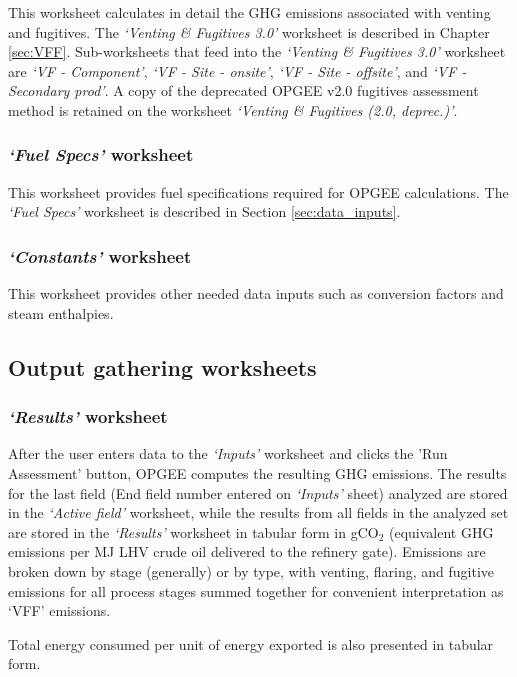 \documentclass[11pt]{report}
\newcommand{\sheet}[1]{\textit{`{#1}'}}
\begin{document}
This worksheet calculates in detail the GHG emissions associated with venting and fugitives. The \sheet{Venting \& Fugitives 3.0} worksheet is described in Chapter \ref{sec:VFF}. Sub-worksheets that feed into the  \sheet{Venting \& Fugitives 3.0}  worksheet are \sheet{VF - Component}, \sheet{VF - Site - onsite}, \sheet{VF - Site - offsite}, and \sheet{VF - Secondary prod}. A copy of the deprecated OPGEE v2.0 fugitives assessment method is retained on the worksheet \sheet{Venting \& Fugitives (2.0, deprec.)}.

\subsubsection{\sheet{Fuel Specs} worksheet}

This worksheet provides fuel specifications required for OPGEE calculations. The \sheet{Fuel Specs} worksheet is described in Section \ref{sec:data_inputs}.

\subsubsection{\sheet{Constants} worksheet} 

This worksheet provides other needed data inputs such as conversion factors and steam enthalpies. 

\subsection{Output gathering worksheets} 

\subsubsection{\sheet{Results} worksheet}

After the user enters data to the \sheet{Inputs} worksheet and clicks the 'Run Assessment' button, OPGEE computes the resulting GHG emissions. The results for the last field (End field number entered on \sheet{Inputs} sheet) analyzed are stored in the \sheet{Active field} worksheet, while the results from all fields in the analyzed set are stored in the \sheet{Results} worksheet in tabular form in gCO$_2$ (equivalent GHG emissions per MJ LHV crude oil delivered to the refinery gate). Emissions are broken down by stage (generally) or by type, with venting, flaring, and fugitive emissions for all process stages summed together for convenient interpretation as `VFF' emissions. 

Total energy consumed per unit of energy exported is also presented in tabular form.
\end{document}
